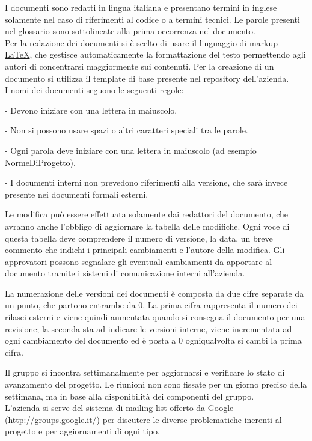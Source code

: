 	I documenti sono redatti in lingua italiana e presentano termini in inglese solamente nel caso di riferimenti al codice o a termini tecnici. Le parole presenti nel glossario sono sottolineate alla prima occorrenza nel documento.\\
	Per la redazione dei documenti si \`e scelto di usare il \underline{linguaggio di markup} \underline{\LaTeX}, che gestisce automaticamente la formattazione del testo permettendo agli autori di concentrarsi maggiormente sui contenuti. Per la creazione di un documento si utilizza il template di base presente nel repository dell'azienda.\\
	I nomi dei documenti seguono le seguenti regole:
	\begin{elencopuntato}[\normindent]
		\item[-] Devono iniziare con una lettera in maiuscolo.
		\item[-] Non si possono usare spazi o altri caratteri speciali tra le parole.
		\item[-] Ogni parola deve iniziare con una lettera in maiuscolo (ad esempio NormeDiProgetto).
		\item[-] I documenti interni non prevedono riferimenti alla versione, che sar\`a invece presente nei documenti formali esterni.
	\end{elencopuntato}
	
	Le modifica pu\`o essere effettuata solamente dai redattori del documento, che avranno anche l'obbligo di aggiornare la tabella delle modifiche. Ogni voce di questa tabella deve comprendere il numero di versione, la data, un breve commento che indichi i principali cambiamenti e l'autore della modifica.
	Gli approvatori possono segnalare gli eventuali cambiamenti da apportare al documento tramite i sistemi di comunicazione interni all'azienda.
	
	La numerazione delle versioni dei documenti \`e composta da due cifre separate da un punto, che partono entrambe da 0. La prima cifra rappresenta il numero dei rilasci esterni e viene quindi aumentata quando si consegna il documento per una revisione; la seconda sta ad indicare le versioni interne, viene incrementata ad ogni cambiamento del documento ed \`e posta a 0 ogniqualvolta si cambi la prima cifra. 

Il gruppo si incontra settimanalmente per aggiornarsi e verificare lo stato di avanzamento del progetto. Le riunioni non sono fissate per un giorno preciso della settimana, ma in base alla disponibilit\`a dei componenti del gruppo.\\
L'azienda si serve del sistema di mailing-list offerto da Google (\href{http://groups.google.it/}{http://groups.google.it/}) per discutere le diverse problematiche inerenti al progetto e per aggiornamenti di ogni tipo.

